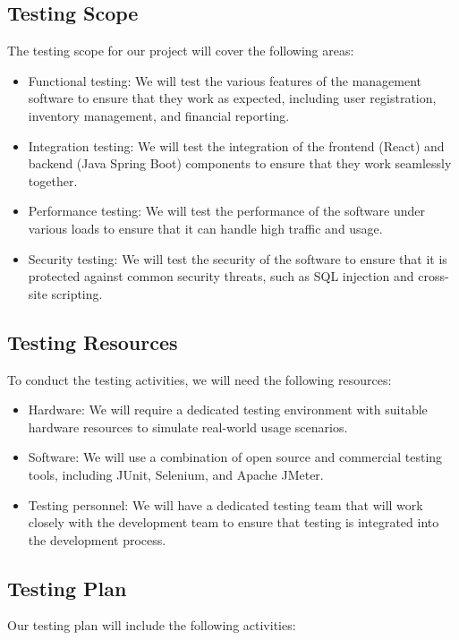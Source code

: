 \documentclass{article}
\begin{document}
\subsection{Testing Scope}
The testing scope for our project will cover the following areas:

\begin{itemize}
\item Functional testing: We will test the various features of the management software to ensure that they work as expected, including user registration, inventory management, and financial reporting.
\item Integration testing: We will test the integration of the frontend (React) and backend (Java Spring Boot) components to ensure that they work seamlessly together.
\item Performance testing: We will test the performance of the software under various loads to ensure that it can handle high traffic and usage.
\item Security testing: We will test the security of the software to ensure that it is protected against common security threats, such as SQL injection and cross-site scripting.
\end{itemize}

\subsection{Testing Resources}
To conduct the testing activities, we will need the following resources:

\begin{itemize}
\item Hardware: We will require a dedicated testing environment with suitable hardware resources to simulate real-world usage scenarios.
\item Software: We will use a combination of open source and commercial testing tools, including JUnit, Selenium, and Apache JMeter.
\item Testing personnel: We will have a dedicated testing team that will work closely with the development team to ensure that testing is integrated into the development process.
\end{itemize}

\subsection{Testing Plan}
Our testing plan will include the following activities:
\end{document}
